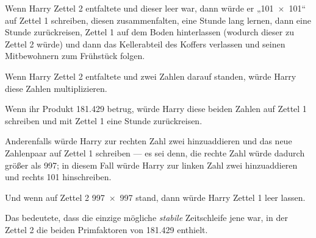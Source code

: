 Wenn Harry Zettel 2 entfaltete und dieser leer war, dann würde er „101~$\times$~101“ auf Zettel 1 schreiben, diesen zusammenfalten, eine Stunde lang lernen, dann eine Stunde zurückreisen, Zettel 1 auf dem Boden hinterlassen (wodurch dieser zu Zettel 2 würde) und dann das Kellerabteil des Koffers verlassen und seinen Mitbewohnern zum Frühstück folgen.

Wenn Harry Zettel 2 entfaltete und zwei Zahlen darauf standen, würde Harry diese Zahlen multiplizieren.

Wenn ihr Produkt 181.429 betrug, würde Harry diese beiden Zahlen auf Zettel 1 schreiben und mit Zettel 1 eine Stunde zurückreisen.

Anderenfalls würde Harry zur rechten Zahl zwei hinzuaddieren und das neue Zahlenpaar auf Zettel 1 schreiben — es sei denn, die rechte Zahl würde dadurch größer als 997; in diesem Fall würde Harry zur linken Zahl zwei hinzuaddieren und rechts 101 hinschreiben.

Und wenn auf Zettel 2 997~$\times$~997 stand, dann würde Harry Zettel 1 leer lassen.

Das bedeutete, dass die einzige mögliche \emph{stabile} Zeitschleife jene war, in der Zettel 2 die beiden Primfaktoren von 181.429 enthielt.

